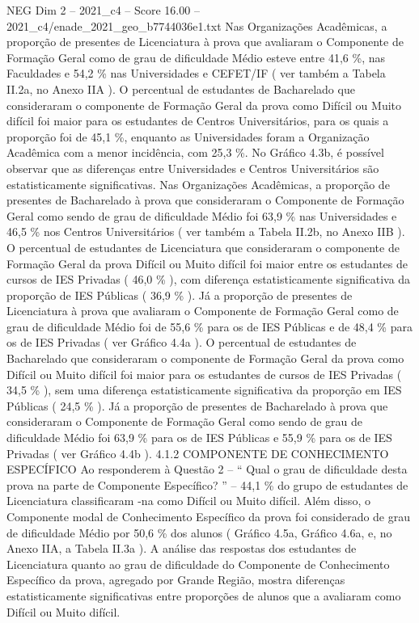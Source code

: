 \begin{textsample}{NEG Dim 2 – 2021\_c4 – Score 16.00 – 2021\_c4/enade\_2021\_geo\_b7744036e1.txt}
Nas Organizações Acadêmicas, a proporção de presentes de Licenciatura à prova que avaliaram o Componente de Formação Geral como de grau de dificuldade Médio esteve entre 41,6 \%, nas Faculdades e 54,2 \% nas Universidades e CEFET/IF ( ver também a Tabela II.2a, no Anexo IIA ).
O percentual de estudantes de Bacharelado que consideraram o componente de Formação Geral da prova como Difícil ou Muito difícil foi maior para os estudantes de Centros Universitários, para os quais a proporção foi de 45,1 \%, enquanto as Universidades foram a Organização Acadêmica com a menor incidência, com 25,3 \%.
No Gráfico 4.3b, é possível observar que as diferenças entre Universidades e Centros Universitários são estatisticamente significativas.
Nas Organizações Acadêmicas, a proporção de presentes de Bacharelado à prova que consideraram o Componente de Formação Geral como sendo de grau de dificuldade Médio foi 63,9 \% nas Universidades e 46,5 \% nos Centros Universitários ( ver também a Tabela II.2b, no Anexo IIB ).
O percentual de estudantes de Licenciatura que consideraram o componente de Formação Geral da prova Difícil ou Muito difícil foi maior entre os estudantes de cursos de IES Privadas ( 46,0 \% ), com diferença estatisticamente significativa da proporção de IES Públicas ( 36,9 \% ).
Já a proporção de presentes de Licenciatura à prova que avaliaram o Componente de Formação Geral como de grau de dificuldade Médio foi de 55,6 \% para os de IES Públicas e de 48,4 \% para os de IES Privadas ( ver Gráfico 4.4a ).
O percentual de estudantes de Bacharelado que consideraram o componente de Formação Geral da prova como Difícil ou Muito difícil foi maior para os estudantes de cursos de IES Privadas ( 34,5 \% ), sem uma diferença estatisticamente significativa da proporção em IES Públicas ( 24,5 \% ).
Já a proporção de presentes de Bacharelado à prova que consideraram o Componente de Formação Geral como sendo de grau de dificuldade Médio foi 63,9 \% para os de IES Públicas e 55,9 \% para os de IES Privadas ( ver Gráfico 4.4b ). 4.1.2 COMPONENTE DE CONHECIMENTO ESPECÍFICO Ao responderem à Questão 2 – “ Qual o grau de dificuldade desta prova na parte de Componente Específico? ” – 44,1 \% do grupo de estudantes de Licenciatura classificaram -na como Difícil ou Muito difícil.
Além disso, o Componente modal de Conhecimento Específico da prova foi considerado de grau de dificuldade Médio por 50,6 \% dos alunos ( Gráfico 4.5a, Gráfico 4.6a, e, no Anexo IIA, a Tabela II.3a ).
A análise das respostas dos estudantes de Licenciatura quanto ao grau de dificuldade do Componente de Conhecimento Específico da prova, agregado por Grande Região, mostra diferenças estatisticamente significativas entre proporções de alunos que a avaliaram como Difícil ou Muito difícil.

\end{textsample}

